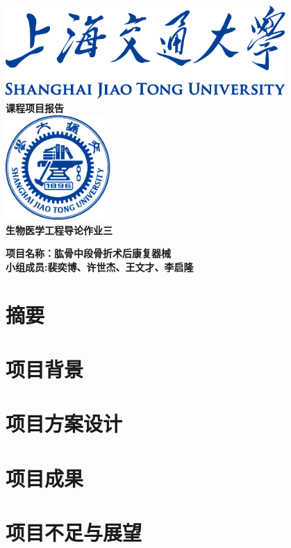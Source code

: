 \documentclass[UTF8]{ctexart}
\begin{document}
\pagestyle{fancy}

\begin{titlepage}
    \begin{center}
        \includegraphics[width=0.8\textwidth]{sjtu-name-blue.pdf}\\[1cm]
        \textsc{\huge \bfseries 课程项目报告}\\[1.5cm]
        \includegraphics[width=0.3\textwidth]{sjtu-badge-blue.pdf}\\[1cm]    
        \textsc{\huge \bfseries 生物医学工程导论作业三}\\[1.5cm]

        \begin{minipage}{0.75\textwidth}
            \begin{flushleft} 
                \LARGE \bfseries{项目名称：肱骨中段骨折术后康复器械}\\
                \LARGE \bfseries{小组成员:裴奕博、许世杰、王文才、李启隆}
            \end{flushleft}
        \end{minipage}

    \end{center}
\end{titlepage}


\section{摘要}

\section{项目背景}
    
\section{项目方案设计}


\section{项目成果}

\section{项目不足与展望}
    
\end{document}
